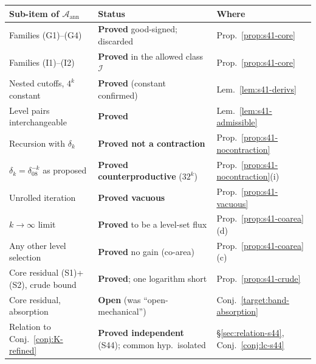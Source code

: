 \documentclass[11pt]{article}
\theoremstyle{definition}
\theoremstyle{remark}
\begin{document}
\begin{center}
\begin{tabular}{lll}
\hline
Sub-item of $\mathcal{A}_{\mathrm{ann}}$ & Status & Where \\
\hline
Families (G1)--(G4) & \textbf{Proved} good-signed; discarded & Prop.~\ref{prop:s41-core} \\
Families (I1)--(I2) & \textbf{Proved} in the allowed class $\mathcal{I}$ & Prop.~\ref{prop:s41-core} \\
Nested cutoffs, $4^{k}$ constant & \textbf{Proved} (constant confirmed) & Lem.~\ref{lem:s41-derivs} \\
Level pairs interchangeable & \textbf{Proved} & Lem.~\ref{lem:s41-admissible} \\
Recursion with $\delta_k$ & \textbf{Proved not a contraction} & Prop.~\ref{prop:s41-nocontraction} \\
$\delta_k=\delta_08^{-k}$ as proposed & \textbf{Proved counterproductive} ($32^{k}$) & Prop.~\ref{prop:s41-nocontraction}(i) \\
Unrolled iteration & \textbf{Proved vacuous} & Prop.~\ref{prop:s41-vacuous} \\
$k\to\infty$ limit & \textbf{Proved} to be a level-set flux & Prop.~\ref{prop:s41-coarea}(d) \\
Any other level selection & \textbf{Proved} no gain (co-area) & Prop.~\ref{prop:s41-coarea}(c) \\
Core residual (S1)+(S2), crude bound & \textbf{Proved}; one logarithm short & Prop.~\ref{prop:s41-crude} \\
Core residual, absorption & \textbf{Open} (was ``open-mechanical'') & Conj.~\ref{target:band-absorption} \\
Relation to Conj.~\ref{conj:K-refined} & \textbf{Proved independent} (S44); common hyp.\ isolated & \S\ref{sec:relation-s44}, Conj.~\ref{conj:lc-s44} \\
\hline
\end{tabular}
\end{center}
\end{document}
